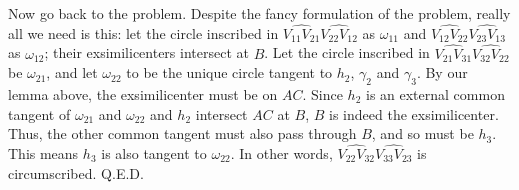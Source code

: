 \documentclass[11pt]{article}
\newcommand{\<}{\langle}
\renewcommand{\>}{\rangle}
\begin{document}
\begin{enumerate}
	Now go back to the problem. Despite the fancy formulation of the problem, really all we need is this: let the circle inscribed in $\widehat{V_{11}V_{21}}\widehat{V_{22}V_{12}}$ as $\omega_{11}$ and $\widehat{V_{12}V_{22}}\widehat{V_{23}V_{13}}$ as $\omega_{12}$; their exsimilicenters intersect at $B$. Let the circle inscribed in $\widehat{V_{21}V_{31}}\widehat{V_{32}V_{22}}$ be $\omega_{21}$, and let $\omega_{22}$ to be the unique circle tangent to $h_2$, $\gamma_2$ and $\gamma_3$. By our lemma above, the exsimilicenter must be on $AC$. Since $h_2$ is an external common tangent of $\omega_{21}$ and $\omega_{22}$ and $h_2$ intersect $AC$ at $B$, $B$ is indeed the exsimilicenter. Thus, the other common tangent must also pass through $B$, and so must be $h_3$. This means $h_3$ is also tangent to $\omega_{22}$. In other words, $\widehat{V_{22}V_{32}}\widehat{V_{33}V_{23}}$ is circumscribed. Q.E.D. 
	
\end{enumerate}
	
	
\end{document}
